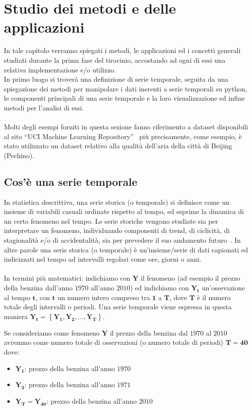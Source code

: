 \section{Studio dei metodi e delle applicazioni}
In tale capitolo verranno spiegati i metodi, le applicazioni ed i concetti 
generali studiati durante la prima fase del tirocinio, accostando ad ogni 
di essi una relativa implementazione e/o utilizzo.\\
In primo luogo si troverà una definizione di serie temporale, seguita da
una spiegazione dei metodi per manipolare i dati inerenti a serie temporali 
su python, le componenti principali di una serie temporale e la loro visualizzazione
ed infine metodi per l'analisi di essi.\\
\\
Molti degli esempi forniti in questa sezione fanno riferimento a dataset disponibili
al sito ``UCI Machine Learning Repository''~\cite{dua:2019} più precisamente, come
esempio, è stato utilizzato un dataset relativo alla qualità dell'aria della città di
Beijing~\cite{dua:air_quality} (Pechino).
 
\subsection{Cos'è una serie temporale}
In statistica descrittiva, una serie storica (o temporale) si definisce come un insieme di variabili 
casuali ordinate rispetto al tempo, ed esprime la dinamica di un certo 
fenomeno nel tempo. Le serie storiche vengono studiate sia per 
interpretare un fenomeno, individuando componenti di trend, di ciclicità, 
di stagionalità e/o di accidentalità, sia per prevedere il suo 
andamento futuro~\cite{wiki:serie_storica}.
In altre parole una serie storica (o temporale) è un'insieme/serie di dati
capionati ed indicizzati nel tempo ad intervalli regolari come ore, giorni 
o anni.\\
\\
In termini più matematici: indichiamo con $\bm{Y}$ il fenomeno (ad esempio 
il prezzo della benzina dall'anno $1970$ all'anno $2010$) ed indichiamo con
$\bm{Y_t}$ un'ossevazione al tempo $\bm{t}$, con $\bm{t}$ un numero intero
compreso tra $\bm{1}$ a $\bm{T}$, dove $\bm{T}$ è il numero totale degli intervalli o 
periodi. Una serie temporale viene espressa in questa maniera 
$\bm{Y_t} = \left\{  \bm{Y_1}, \bm{Y_2}, \dots , \bm{Y_T}  \right\}$.

\begin{esempio} 
    Se consideriamo come fenomeno $\bm{Y}$ il prezzo della benzina dal $1970$ al $2010$
    avremmo come numero totale di osservazioni (o numero totale di periodi) 
    $\bm{T} = \bm{40}$ dove:
    \begin{itemize}
        \setlength\itemsep{-0.5em}
        \item $\bm{Y_1}$: prezzo della benzina all'anno $1970$
        \item $\bm{Y_2}$: prezzo della benzina all'anno $1971$
        \item $\bm{Y_T} = \bm{Y_{40}}$: prezzo della benzina all'anno $2010$
    \end{itemize}

\end{esempio}



